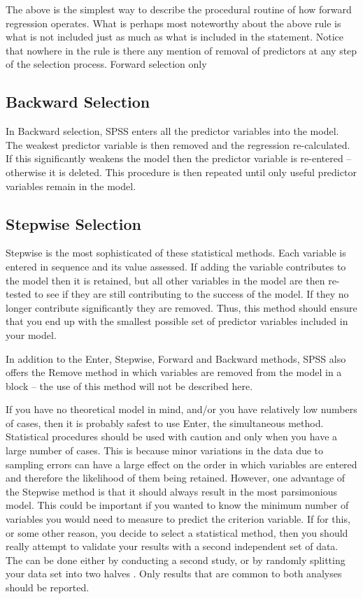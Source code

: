 \documentclass[a4paper,12pt]{article}
\begin{document}
The above is the simplest way to describe the procedural routine of how forward regression operates. What is perhaps most noteworthy about the above rule is what is not included just as much as what is included in the statement. Notice that nowhere in the rule is there any mention of removal of predictors at any step of the selection process. Forward selection only

\subsection{Backward Selection}
In Backward selection, SPSS enters all the predictor variables into the model. The weakest predictor variable is then removed and the regression re-calculated. If this
significantly weakens the model then the predictor variable is re-entered – otherwise it is deleted. This procedure is then repeated until only useful predictor variables remain in the model.

\subsection{Stepwise Selection}
Stepwise is the most sophisticated of these statistical methods. Each variable is entered in sequence and its value assessed. If adding the variable contributes to the model then it is retained, but all other variables in the model are then re-tested to see if they are still contributing to the success of the model. If they no longer contribute significantly they are removed. Thus, this method should ensure that you end up with the smallest possible set of predictor variables included in your model.


In addition to the Enter, Stepwise, Forward and Backward methods, SPSS also offers the Remove method in which variables are removed from the model in a block – the use of this method will not be described here.

If you have no theoretical model in mind, and/or you have relatively low numbers
of cases, then it is probably safest to use Enter, the simultaneous method. Statistical
procedures should be used with caution and only when you have a large number of
cases. This is because minor variations in the data due to sampling errors can have a
large effect on the order in which variables are entered and therefore the likelihood
of them being retained. However, one advantage of the Stepwise method is that it
should always result in the most parsimonious model. This could be important if
you wanted to know the minimum number of variables you would need to measure
to predict the criterion variable. If for this, or some other reason, you decide to
select a statistical method, then you should really attempt to validate your results
with a second independent set of data. The can be done either by conducting a
second study, or by randomly splitting your data set into two halves . Only results that are common to both analyses should be reported.
\end{document}
